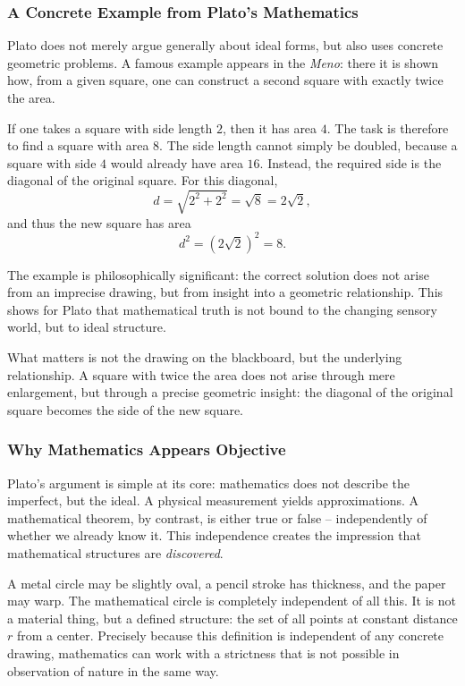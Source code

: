\subsubsection*{A Concrete Example from Plato's Mathematics}

Plato does not merely argue generally about ideal forms,
but also uses concrete geometric problems.
A famous example appears in the \emph{Meno}:
there it is shown
how, from a given square, one can construct a second square
with exactly twice the area.

If one takes a square with side length \(2\),
then it has area \(4\).
The task is therefore to find a square with area \(8\).
The side length cannot simply be doubled,
because a square with side \(4\) would already have area \(16\).
Instead, the required side is the diagonal of the original square.
For this diagonal,
\[
d = \sqrt{2^2+2^2} = \sqrt{8} = 2\sqrt{2},
\]
and thus the new square has area
\[
d^2 = (2\sqrt{2})^2 = 8.
\]

The example is philosophically significant:
the correct solution does not arise from an imprecise drawing,
but from insight into a geometric relationship.
This shows for Plato
that mathematical truth is not bound to the changing sensory world,
but to ideal structure.

\begin{DidacticBox}
	\label{box:plato-square}
	\small
	What matters is not the drawing on the blackboard,
	but the underlying relationship.
	A square with twice the area does not arise through mere enlargement,
	but through a precise geometric insight:
	the diagonal of the original square becomes the side of the new square.
\end{DidacticBox}

\subsubsection*{Why Mathematics Appears Objective}

Plato's argument is simple at its core:
mathematics does not describe the imperfect,
but the ideal.
A physical measurement yields approximations.
A mathematical theorem, by contrast, is either true or false --
independently of whether we already know it.
This independence creates the impression
that mathematical structures are \emph{discovered}.

A metal circle may be slightly oval,
a pencil stroke has thickness,
and the paper may warp.
The mathematical circle is completely independent of all this.
It is not a material thing,
but a defined structure:
the set of all points at constant distance \(r\) from a center.
Precisely because this definition is independent of any concrete drawing,
mathematics can work with a strictness
that is not possible in observation of nature in the same way.

